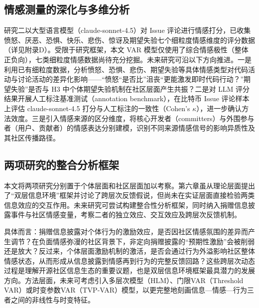 \documentclass[
    type = master, %
    degree = professional,        %
    decl-page,  %
    twoside,                %
    fontset = fandol %
  ]{njuthesis}
\begin{document}
\subsection{情感测量的深化与多维分析}

研究二以大型语言模型（claude-sonnet-4.5）对 Issue 评论进行情感打分，已收集愤怒、厌恶、恐惧、快乐、悲伤、惊讶及期望失验七个细粒度情感维度的评分数据（详见附录D）。受限于研究框架，本文 VAR 模型仅使用了综合情感极性（整体正负向），七类细粒度情感数据尚待充分挖掘。未来研究可沿以下方向推进。一是利用已有细粒度数据，分析愤怒、恐惧、悲伤、期望失验等具体情感类型对代码活动与讨论活动的差异化影响——“愤怒“是否比”沮丧“更能激发即时代码行动？”期望失验”是否与 H3 中个体期望失验机制在社区层面产生共振？二是对 LLM 评分结果开展人工标注基准测试（annotation benchmark），在比特币 Issue 评论样本上评估 claude-sonnet-4.5 打分与人工标注的一致性（Cohen's $\kappa$），进一步确认方法效度。三是引入情感来源的区分维度，将核心开发者（committers）与外围参与者（用户、贡献者）的情感表达分别建模，识别不同来源情感信号的影响异质性及其社区传播路径。

\subsection{两项研究的整合分析框架}

本文将两项研究分别置于个体层面和社区层面加以考察。第六章虽从理论层面提出了“双层信息环境”框架并讨论了跨层次反馈假说，但尚未在实证层面直接检验两类信息效应的交互作用。未来研究可尝试构建整合性分析框架，同时纳入捐赠信息披露事件与社区情感变量，考察二者的独立效应、交互效应及跨层次反馈机制。

具体而言：捐赠信息披露对个体行为的激励效应，是否因社区情感氛围的差异而产生调节？在负面情感弥漫的社区背景下，非定向捐赠披露的“预期性激励”会被削弱还是放大？反过来，个体层面激励机制的激活，是否会通过行为外溢影响社区整体情感状态，从而形成从信息披露到情感再到行为的完整反馈回路？这些跨层次动态过程是理解开源社区信息生态的重要议题，也是双层信息环境框架最具潜力的发展方向。方法层面，未来可考虑引入多层次模型（HLM）、门限VAR（Threshold VAR）或时变参数VAR（TVP-VAR）模型，以更完整地刻画信息—情感—行为三者之间的非线性与时变特征。



\printbibliography

\end{document}
